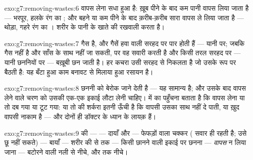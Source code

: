 \begin{solution}{exo:g7:removing-wastes:6}
वापस लेना सधा हुआ है: ख़ूब पीने के बाद कम पानी वापस लिया जाता है ---
भरपूर, हलके रंग का ; और  बहने या कम पीने के बाद क़रीब-क़रीब
सारा वापस ले लिया जाता है --- थोड़ा, गहरे रंग का ।  शरीर के
पानी के खाते की रखवाली करता है।
\end{solution}

\begin{solution}{exo:g7:removing-wastes:7}
 गैस है, और गैसें हवा वाली सरहद पर पार होती हैं ---
यानी  पर; जबकि  गैस नहीं है और साँस के साथ नहीं जा सकती,
पर वह  सवारी करती है और किसी तरल सरहद पर --- यानी छननियों पर
--- बख़ूबी छन जाती है। हर कचरा उसी सरहद से निकलता है जो उसके रूप पर
बैठती है: यह बँटा हुआ काम बनावट से मिलाया हुआ रसायन है।
\end{solution}

\begin{solution}{exo:g7:removing-wastes:8}
छननी  को बेरोक जाने देती है --- यह सामान्य है; और उसके बाद वापस
लेने वाले चरण को उसकी एक-एक इकाई लौटा लेनी चाहिए।  में  का
पहुँचना बताता है कि वापस लेना या तो दब गया या टूट गया: या तो  की
शर्करा इतनी ऊँची है कि वापसी उसका साथ नहीं दे पाती, या ख़ुद वापसी नाकाम
है --- और दोनों ही डॉक्टर के ध्यान के लायक़ हैं।
\end{solution}

\begin{solution}{exo:g7:removing-wastes:9}
 की  ---  --- दायाँ  और  --- फेफड़ों वाला चक्कर
( सवार ही रहती है;  उसे छू नहीं सकते) --- बायाँ  ---
शरीर की  से  तक --- किसी छानने वाली इकाई पर छनना ---
\emph{वापस} न लिया जाना --- बटोरने वाली नली से नीचे, और  तक
नीचे।
\end{solution}

